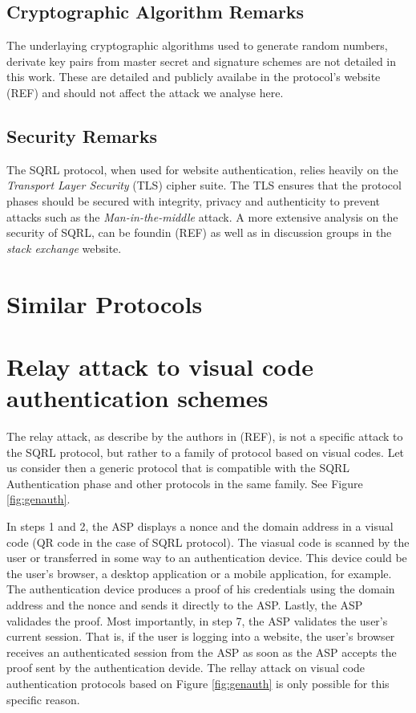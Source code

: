 \documentclass{article}
\begin{document}
	

\subsection{Cryptographic Algorithm Remarks}
	The underlaying cryptographic algorithms used to generate random numbers, derivate
	key pairs from master secret and signature schemes are not detailed in this work.
	These are detailed and publicly availabe in the protocol's website (REF) and should not
	affect the attack we analyse here. 

\subsection{Security Remarks}
	The SQRL protocol, when used for website authentication, relies heavily on
	the \emph{Transport Layer Security} (TLS) cipher suite. The TLS ensures that
	the protocol phases should be secured with integrity, privacy and authenticity
	to prevent attacks such as the \emph{Man-in-the-middle} attack. A more extensive 
	analysis on the security of SQRL, can be foundin (REF) as well as in discussion 
	groups in the \emph{stack exchange} website.

\section{Similar Protocols}

\section[Relay attack to visual code authentication schemes]{Relay attack to visual code \\
authentication schemes}
	The relay attack, as describe by the authors in (REF), is not a specific
	attack to the SQRL protocol, but rather to a family of protocol based on
	visual codes. Let us consider then a generic protocol that is compatible
	with the SQRL Authentication phase and other protocols in the same family.
	See Figure \ref{fig:genauth}.

	
	
	In steps 1 and 2, the ASP displays a nonce and the domain address in
	a visual code (QR code in the case of SQRL protocol). The viasual code is
	scanned by the user or transferred in some way to an authentication device.
	This device could be the user's browser, a desktop application or a mobile
	application, for example. The authentication device produces a proof of
	his credentials using the domain address and the nonce and sends it directly
	to the ASP. Lastly, the ASP validades the proof. Most importantly, in step
	7, the ASP validates the user's current session. That is, if the user is
	logging into a website, the user's browser receives an authenticated session
	from the ASP as soon as the ASP accepts the proof sent by the authentication
	devide. The rellay attack on visual code authentication protocols based on Figure
	\ref{fig:genauth} is only possible for this specific reason.
\end{document}
